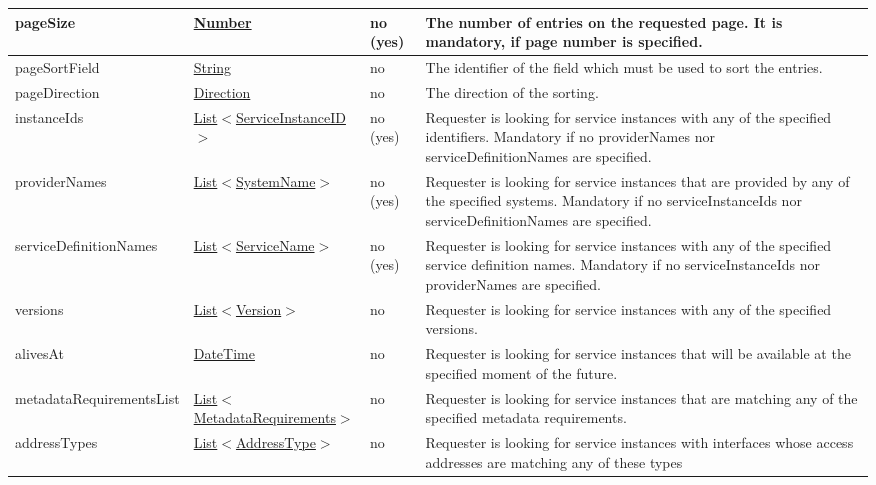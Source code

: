 \documentclass[a4paper]{arrowhead}
\newcommand{\pref}[1]{{\textcolor{ArrowheadGrey}{\hyperref[sec:model:primitives:#1]{#1}}}}
\begin{document}
\begin{table}[ht!]
\begin{tabularx}{\textwidth}{| p{5.6cm} | p{4.9cm} | p{2cm} | X |} \hline
pageSize & \pref{Number} & no (yes) & The number of entries on the requested page. It is mandatory, if page number is specified. \\ \hline
pageSortField & \pref{String} & no & The identifier of the field which must be used to sort the entries. \\ \hline
pageDirection & \pref{Direction} & no & The direction of the sorting. \\ \hline
instanceIds &  \pref{List}$<$\pref{ServiceInstanceID}$>$ & no (yes) & Requester is looking for service instances with any of the spe\-cified identifiers. Mandatory if no providerNames nor serviceDefinitionNames are spe\-cified. \\ \hline
providerNames &  \pref{List}$<$\pref{SystemName}$>$ & no (yes) & Requester is looking for service ins\-tances that are provided by any of the specified systems. Mandatory if no serviceInstanceIds nor serviceDefinitionNames are spe\-cified. \\ \hline
serviceDefinitionNames &  \pref{List}$<$\pref{ServiceName}$>$ & no (yes) & Requester is looking for service ins\-tances with any of the specified service definition names. Mandatory if no serviceInstanceIds nor providerNames are spe\-cified. \\ \hline
versions &  \pref{List}$<$\pref{Version}$>$ & no & Requester is looking for service ins\-tances with any of the specified versions. \\ \hline
alivesAt & \pref{DateTime} & no & Requester is looking for service ins\-tances that will be available at the specified moment of the future. \\ \hline
metadataRequirementsList & \pref{List}$<$\hyperref[sec:model:MetadataRequirements]{MetadataRequirements}$>$ & no & Requester is looking for service ins\-tances that are matching any of the specified metadata requirements.  \\ \hline
addressTypes & \pref{List}$<$\pref{AddressType}$>$ & no & Requester is looking for service ins\-tances with interfaces whose access addresses are matching any of these types \\ \hline
\end{tabularx}
\end{table}

\clearpage
\end{document}
